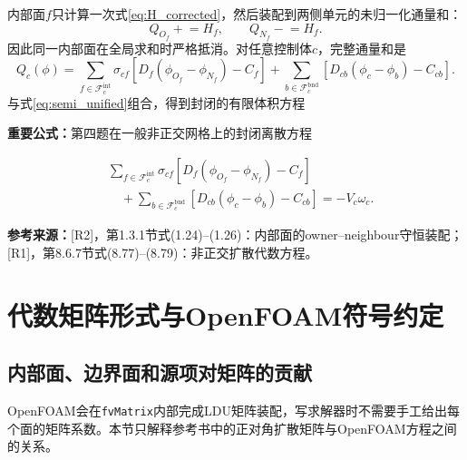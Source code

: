 \documentclass[UTF8,12pt,a4paper]{ctexart}
\numberwithin{equation}{section}
\newcommand{\Rone}{\textnormal{[R1]}}
\newcommand{\Rtwo}{\textnormal{[R2]}}
\newcommand{\source}[1]{%
  \par\smallskip
  \noindent\colorbox{sourcebg}{%
    \parbox{0.955\linewidth}{\footnotesize\color{sourcegray}\textbf{参考来源：}#1}%
  }
  \par\smallskip
}
\newcommand{\keytitle}[1]{%
  \par\smallskip\noindent
  \colorbox{keybg}{\parbox{0.965\linewidth}{\color{keyblue}\textbf{重要公式：}#1}}
  \par\smallskip
}
\begin{document}
内部面$f$只计算一次式\eqref{eq:H_corrected}，然后装配到两侧单元的未归一化通量和：
\begin{equation}
  \boxed{
  Q_{O_f}\mathrel{+}=H_f,
  \qquad
  Q_{N_f}\mathrel{-}=H_f.}
  \label{eq:assembly}
\end{equation}
因此同一内部面在全局求和时严格抵消。对任意控制体$c$，完整通量和是
\begin{equation}
  Q_c(\phi)
  =\sum_{f\in\mathcal F_c^{\mathrm{int}}}
  \sigma_{cf}
  \left[D_f(\phi_{O_f}-\phi_{N_f})-C_f\right]
  +\sum_{b\in\mathcal F_c^{\mathrm{bnd}}}
  \left[D_{cb}(\phi_c-\phi_b)-C_{cb}\right].
  \label{eq:Q_full}
\end{equation}
与式\eqref{eq:semi_unified}组合，得到封闭的有限体积方程
\keytitle{第四题在一般非正交网格上的封闭离散方程}
\begin{equation}
  \boxed{
  \begin{aligned}
  &\sum_{f\in\mathcal F_c^{\mathrm{int}}}
  \sigma_{cf}
  \left[D_f(\phi_{O_f}-\phi_{N_f})-C_f\right]\\
  &\quad+
  \sum_{b\in\mathcal F_c^{\mathrm{bnd}}}
  \left[D_{cb}(\phi_c-\phi_b)-C_{cb}\right]
  =-V_c\omega_c.
  \end{aligned}}
  \label{eq:closed_discrete}
\end{equation}

\source{\Rtwo，第1.3.1节式(1.24)--(1.26)：内部面的owner--neighbour守恒装配；\Rone，第8.6.7节式(8.77)--(8.79)：非正交扩散代数方程。}

\newpage
\section{代数矩阵形式与OpenFOAM符号约定}

\subsection{内部面、边界面和源项对矩阵的贡献}

OpenFOAM会在\texttt{fvMatrix}内部完成LDU矩阵装配，写求解器时不需要手工给出每个面的矩阵系数。本节只解释参考书中的正对角扩散矩阵与OpenFOAM方程之间的关系。
\end{document}
